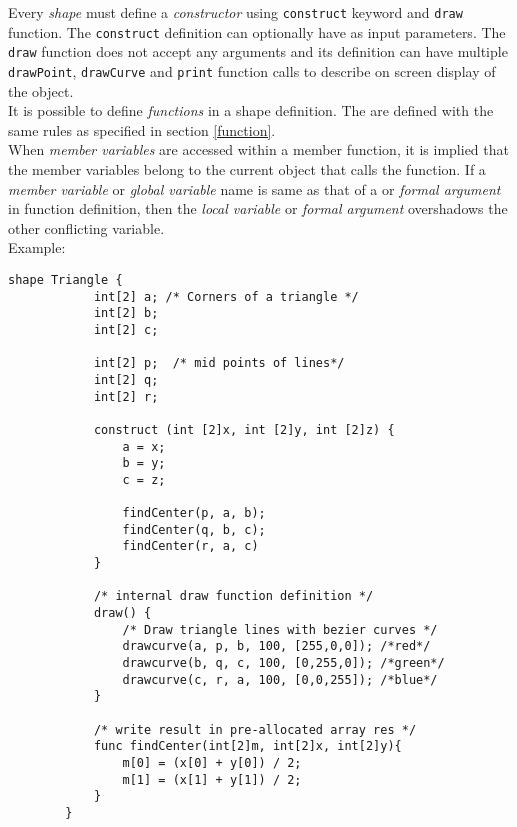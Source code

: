     Every \textit{shape} must define a \textit{constructor} using \texttt{construct} keyword and \texttt{draw} function. The \texttt{construct} definition can optionally have  as input parameters. The \texttt{draw} function does not accept any arguments and its definition can have multiple \texttt{drawPoint}, \texttt{drawCurve} and \texttt{print} function calls to describe on screen display of the object.\\

    It is possible to define \textit{functions} in a shape definition. The  are defined with the same rules as specified in section \ref{function}.\\
    When \textit{member variables} are accessed within a member function, it is implied that the member variables belong to the current object that calls the function. If a \textit{member variable} or \textit{global variable} name is same as that of a  or \textit{formal argument} in function definition, then the \textit{local variable} or \textit{formal argument} overshadows the other conflicting variable.\\

    Example:\\
    \begin{lstlisting}[style=sol]
        shape Triangle {
            int[2] a; /* Corners of a triangle */
            int[2] b;
            int[2] c;

            int[2] p;  /* mid points of lines*/
            int[2] q;
            int[2] r;

            construct (int [2]x, int [2]y, int [2]z) {
                a = x;
                b = y;
                c = z;

                findCenter(p, a, b);
                findCenter(q, b, c);
                findCenter(r, a, c)
            }

            /* internal draw function definition */
            draw() {
                /* Draw triangle lines with bezier curves */
                drawcurve(a, p, b, 100, [255,0,0]); /*red*/
                drawcurve(b, q, c, 100, [0,255,0]); /*green*/
                drawcurve(c, r, a, 100, [0,0,255]); /*blue*/
            }

            /* write result in pre-allocated array res */
            func findCenter(int[2]m, int[2]x, int[2]y){
                m[0] = (x[0] + y[0]) / 2;
                m[1] = (x[1] + y[1]) / 2;
            }
        }
    \end{lstlisting}

